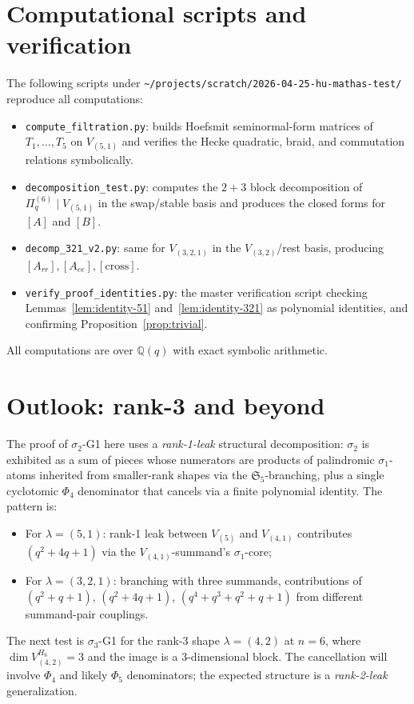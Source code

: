 \documentclass[11pt]{article}
\theoremstyle{plain}
\theoremstyle{definition}
\theoremstyle{remark}
\newcommand{\Q}{\mathbb{Q}}
\newcommand{\Sym}{\mathfrak{S}}
\newcommand{\Pibs}{\Pi_q}
\begin{document}
\section{Computational scripts and verification}\label{sec:scripts}

The following scripts under
\verb|~/projects/scratch/2026-04-25-hu-mathas-test/| reproduce all
computations:
\begin{itemize}[itemsep=0pt,topsep=0pt]
\item \verb|compute_filtration.py|: builds Hoefsmit seminormal-form matrices
of $T_1,\ldots,T_5$ on $V_{(5,1)}$ and verifies the Hecke quadratic, braid,
and commutation relations symbolically.
\item \verb|decomposition_test.py|: computes the $2 + 3$ block decomposition
of $\Pibs^{(6)}\mid V_{(5,1)}$ in the swap/stable basis and produces the
closed forms for $[A]$ and $[B]$.
\item \verb|decomp_321_v2.py|: same for $V_{(3,2,1)}$ in the
$V_{(3,2)}$/rest basis, producing $[A_{rr}],[A_{ee}],[\mathrm{cross}]$.
\item \verb|verify_proof_identities.py|: the master verification script
checking Lemmas~\ref{lem:identity-51} and~\ref{lem:identity-321} as
polynomial identities, and confirming Proposition~\ref{prop:trivial}.
\end{itemize}

All computations are over $\Q(q)$ with exact symbolic arithmetic.

\section{Outlook: rank-3 and beyond}

The proof of $\sigma_2$-G1 here uses a \emph{rank-1-leak} structural
decomposition: $\sigma_2$ is exhibited as a sum of pieces whose numerators
are products of palindromic $\sigma_1$-atoms inherited from smaller-rank
shapes via the $\Sym_5$-branching, plus a single cyclotomic $\Phi_4$
denominator that cancels via a finite polynomial identity. The pattern is:
\begin{itemize}[itemsep=0pt,topsep=0pt]
\item For $\lambda = (5,1)$: rank-1 leak between $V_{(5)}$ and $V_{(4,1)}$
contributes $(q^2+4q+1)$ via the $V_{(4,1)}$-summand's $\sigma_1$-core;
\item For $\lambda = (3,2,1)$: branching with three summands,
contributions of $(q^2+q+1)$, $(q^2+4q+1)$, $(q^4+q^3+q^2+q+1)$ from
different summand-pair couplings.
\end{itemize}
The next test is $\sigma_3$-G1 for the rank-3 shape $\lambda = (4,2)$
at $n=6$, where $\dim V_{(4,2)}^{H_6} = 3$ and the image is a
$3$-dimensional block. The cancellation will involve $\Phi_4$ and
likely $\Phi_5$ denominators; the expected structure is a
\emph{rank-2-leak} generalization.
\end{document}
